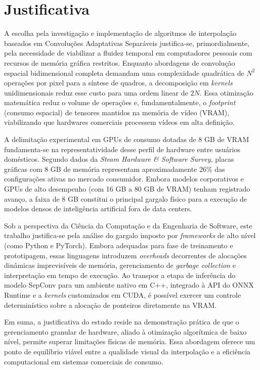 \documentclass[
    12pt,                %
    openright,           %
    oneside,             %
    a4paper,             %
    english,             %
    brazil               %
]{abntex2}
\begin{document}
\section{Justificativa}
\label{sec:justificativa}

A escolha pela investigação e implementação de algoritmos de interpolação baseados em Convoluções Adaptativas Separáveis justifica-se, primordialmente, pela necessidade de viabilizar a fluidez temporal em computadores pessoais com recursos de memória gráfica restritos. Enquanto abordagens de convolução espacial bidimensional completa demandam uma complexidade quadrática de $N^2$ operações por pixel para a síntese de quadros, a decomposição em \textit{kernels} unidimensionais reduz esse custo para uma ordem linear de $2N$. Essa otimização matemática reduz o volume de operações e, fundamentalmente, o \textit{footprint} (consumo espacial) de tensores mantidos na memória de vídeo (VRAM), viabilizando que hardwares comerciais processem vídeos em alta definição.

A delimitação experimental em GPUs de consumo dotadas de 8 GB de VRAM fundamenta-se na representatividade desse perfil de hardware entre usuários domésticos. Segundo dados da \textit{Steam Hardware \& Software Survey}, placas gráficas com 8 GB de memória representam aproximadamente 26\% das configurações ativas no mercado consumidor. Embora modelos corporativos e GPUs de alto desempenho (com 16 GB a 80 GB de VRAM) tenham registrado avanço, a faixa de 8 GB constitui o principal gargalo físico para a execução de modelos densos de inteligência artificial fora de data centers.

Sob a perspectiva da Ciência da Computação e da Engenharia de Software, este trabalho justifica-se pela análise do gargalo imposto por \textit{frameworks} de alto nível (como Python e PyTorch). Embora adequadas para fase de treinamento e prototipagem, essas linguagens introduzem \textit{overheads} decorrentes de alocações dinâmicas imprevisíveis de memória, gerenciamento de \textit{garbage collection} e interpretação em tempo de execução. Ao transpor a etapa de inferência do modelo SepConv para um ambiente nativo em C++, integrado à API do ONNX Runtime e a \textit{kernels} customizados em CUDA, é possível exercer um controle determinístico sobre a alocação de ponteiros diretamente na VRAM.

Em suma, a justificativa do estudo reside na demonstração prática de que o gerenciamento granular de hardware, aliado à otimização algorítmica de baixo nível, permite superar limitações físicas de memória. Essa abordagem oferece um ponto de equilíbrio viável entre a qualidade visual da interpolação e a eficiência computacional em sistemas comerciais de consumo.
\end{document}

